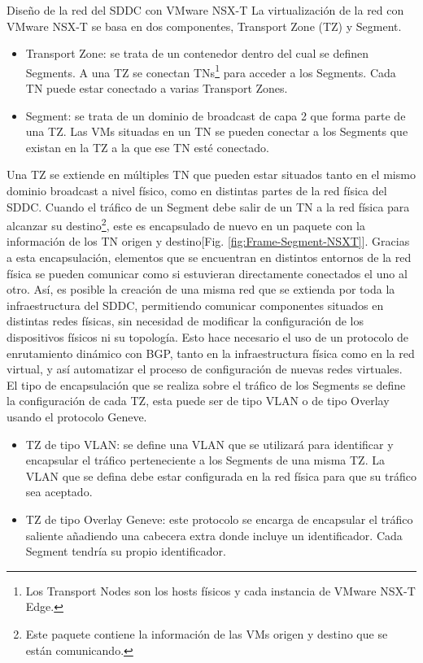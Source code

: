 \begin{subsubsection}{Diseño de la red del SDDC con VMware NSX-T}
    La virtualización de la red con VMware NSX-T se basa en dos componentes, Transport Zone (TZ) y Segment.
    \begin{itemize}
        \item Transport Zone: se trata de un contenedor dentro del cual se definen Segments. A una TZ se conectan TNs\footnote{Los Transport Nodes son los hosts físicos y cada instancia de VMware NSX-T Edge.} para acceder a los Segments. Cada TN puede estar conectado a varias Transport Zones.
        \item Segment: se trata de un dominio de broadcast de capa 2 que forma parte de una TZ. Las VMs situadas en un TN se pueden conectar a los Segments que existan en la TZ a la que ese TN esté conectado.
    \end{itemize}
    Una TZ se extiende en múltiples TN que pueden estar situados tanto en el mismo dominio broadcast a nivel físico, como en distintas partes de la red física del SDDC. Cuando el tráfico de un Segment debe salir de un TN a la red física para alcanzar su destino\footnote{Este paquete contiene la información de las VMs origen y destino que se están comunicando.}, este es encapsulado de nuevo en un paquete con la información de los TN origen y destino[Fig. \ref{fig:Frame-Segment-NSXT}]. Gracias a esta encapsulación, elementos que se encuentran en distintos entornos de la red física se pueden comunicar como si estuvieran directamente conectados el uno al otro. Así, es posible la creación de una misma red que se extienda por toda la infraestructura del SDDC, permitiendo comunicar componentes situados en distintas redes físicas, sin necesidad de modificar la configuración de los dispositivos físicos ni su topología. Esto hace necesario el uso de un protocolo de enrutamiento dinámico con BGP, tanto en la infraestructura física como en la red virtual, y así automatizar el proceso de configuración de nuevas redes virtuales.
    El tipo de encapsulación que se realiza sobre el tráfico de los Segments se define la configuración de cada TZ, esta puede  ser de tipo VLAN o de tipo Overlay usando el protocolo Geneve.
    \begin{itemize}
        \item TZ de tipo VLAN: se define una VLAN que se utilizará para identificar y encapsular el tráfico perteneciente a los Segments de una misma TZ. La VLAN que se defina debe estar configurada en la red física para que su tráfico sea aceptado.
        \item TZ de tipo Overlay Geneve: este protocolo se encarga de encapsular el tráfico saliente añadiendo una cabecera extra donde incluye un identificador. Cada Segment tendría su propio identificador.

\end{itemize}
\end{subsubsection}
